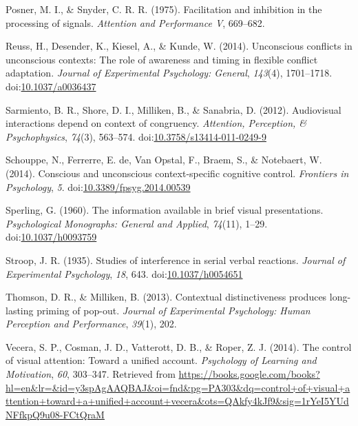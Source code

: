 \documentclass[english,,man,floatsintext]{apa6}
\begin{document}
\hypertarget{ref-posner_facilitation_1975}{}
Posner, M. I., \& Snyder, C. R. R. (1975). Facilitation and inhibition
in the processing of signals. \emph{Attention and Performance V},
669--682.

\hypertarget{ref-reuss_unconscious_2014}{}
Reuss, H., Desender, K., Kiesel, A., \& Kunde, W. (2014). Unconscious
conflicts in unconscious contexts: The role of awareness and timing in
flexible conflict adaptation. \emph{Journal of Experimental Psychology:
General}, \emph{143}(4), 1701--1718.
doi:\href{https://doi.org/10.1037/a0036437}{10.1037/a0036437}

\hypertarget{ref-sarmiento_audiovisual_2012}{}
Sarmiento, B. R., Shore, D. I., Milliken, B., \& Sanabria, D. (2012).
Audiovisual interactions depend on context of congruency.
\emph{Attention, Perception, \& Psychophysics}, \emph{74}(3), 563--574.
doi:\href{https://doi.org/10.3758/s13414-011-0249-9}{10.3758/s13414-011-0249-9}

\hypertarget{ref-schouppe_conscious_2014}{}
Schouppe, N., Ferrerre, E. de, Van Opstal, F., Braem, S., \& Notebaert,
W. (2014). Conscious and unconscious context-specific cognitive control.
\emph{Frontiers in Psychology}, \emph{5}.
doi:\href{https://doi.org/10.3389/fpsyg.2014.00539}{10.3389/fpsyg.2014.00539}

\hypertarget{ref-sperling_information_1960}{}
Sperling, G. (1960). The information available in brief visual
presentations. \emph{Psychological Monographs: General and Applied},
\emph{74}(11), 1--29.
doi:\href{https://doi.org/10.1037/h0093759}{10.1037/h0093759}

\hypertarget{ref-stroop_studies_1935}{}
Stroop, J. R. (1935). Studies of interference in serial verbal
reactions. \emph{Journal of Experimental Psychology}, \emph{18}, 643.
doi:\href{https://doi.org/10.1037/h0054651}{10.1037/h0054651}

\hypertarget{ref-thomson_contextual_2013}{}
Thomson, D. R., \& Milliken, B. (2013). Contextual distinctiveness
produces long-lasting priming of pop-out. \emph{Journal of Experimental
Psychology: Human Perception and Performance}, \emph{39}(1), 202.

\hypertarget{ref-vecera_control_2014}{}
Vecera, S. P., Cosman, J. D., Vatterott, D. B., \& Roper, Z. J. (2014).
The control of visual attention: Toward a unified account.
\emph{Psychology of Learning and Motivation}, \emph{60}, 303--347.
Retrieved from
\url{https://books.google.com/books?hl=en\&lr=\&id=y3spAgAAQBAJ\&oi=fnd\&pg=PA303\&dq=control+of+visual+attention+toward+a+unified+account+vecera\&ots=QAkfy4kJf9\&sig=1rYeI5YUdNFfkpQ9u08-FCtQraM}
\end{document}
